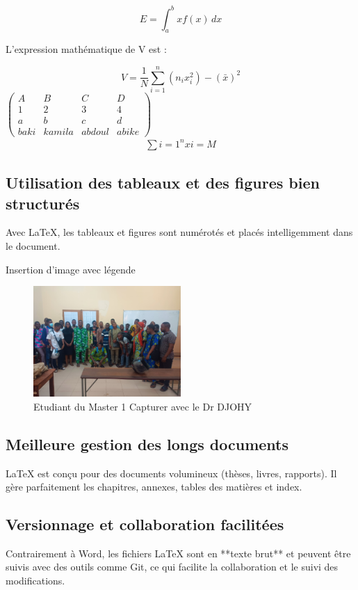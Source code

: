 \documentclass[a4paper,12pt]{article} %
\begin{document}
\[
E = \int_{a}^{b} x f(x) \,dx
\]
 
L'expression mathématique de V est :

\[
V = \frac{1}{N} \sum_{i=1}^{n} (n_i x_i^2) - \left( \bar{x} \right)^2
\]
$\left(\begin{array}{cccc}
A & B & C & D \\ 
1 & 2 & 3 & 4 \\ 
a & b & c & d \\ 
baki & kamila & abdoul & abike
\end{array}\right)$ 
\begin{eqnarray}
\sum{i=1}^n xi=M
\end{eqnarray}

\subsection{Utilisation des tableaux et des figures bien structurés}
Avec \LaTeX{}, les tableaux et figures sont numérotés et placés intelligemment dans le document.

Insertion d'image avec légende
\begin{figure}[h]
    \centering
    \includegraphics[width=0.5\textwidth]{aa.jpg} %
    \caption{Etudiant du Master 1 Capturer avec le Dr DJOHY}
    \label{fig:Etudiant du Master 1 2024-2025} %
\end{figure}

\subsection{Meilleure gestion des longs documents}
\LaTeX{} est conçu pour des documents volumineux (thèses, livres, rapports). 
Il gère parfaitement les chapitres, annexes, tables des matières et index.

\subsection{Versionnage et collaboration facilitées}
Contrairement à Word, les fichiers \LaTeX{} sont en **texte brut** et peuvent être suivis avec des outils comme Git, ce qui facilite la collaboration et le suivi des modifications.
\end{document}
